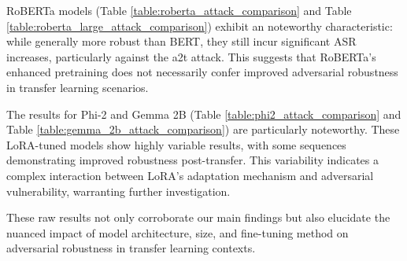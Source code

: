 \documentclass{article}
\begin{document}
RoBERTa models (Table \ref{table:roberta_attack_comparison} and Table \ref{table:roberta_large_attack_comparison}) exhibit an noteworthy characteristic: while generally more robust than BERT, they still incur significant ASR increases, particularly against the a2t attack. This suggests that RoBERTa's enhanced pretraining does not necessarily confer improved adversarial robustness in transfer learning scenarios.

The results for Phi-2 and Gemma 2B (Table \ref{table:phi2_attack_comparison} and Table \ref{table:gemma_2b_attack_comparison}) are particularly noteworthy. These LoRA-tuned models show highly variable results, with some sequences demonstrating improved robustness post-transfer. This variability indicates a complex interaction between LoRA's adaptation mechanism and adversarial vulnerability, warranting further investigation.

These raw results not only corroborate our main findings but also elucidate the nuanced impact of model architecture, size, and fine-tuning method on adversarial robustness in transfer learning contexts.
\end{document}
